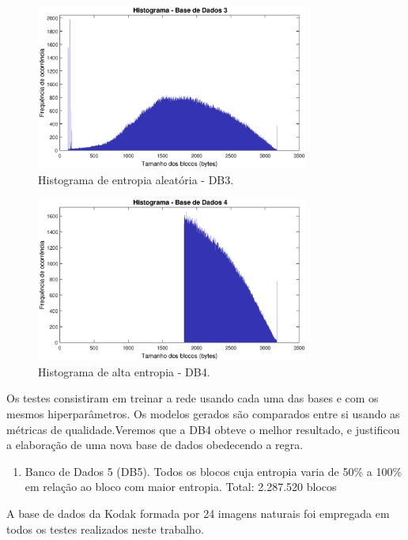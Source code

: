 \begin{figure}[h]
\centering
\includegraphics[width=0.80\textwidth]{figuras/hist3.eps}
\caption[Histograma da entropia aleatória - DB3]{Histograma de entropia aleatória - DB3.}
\label{fig:database3}
\end{figure}

\begin{figure}[h]
\centering
\includegraphics[width=0.8\textwidth]{figuras/hist4.eps}
\caption[Histograma de alta entropia - DB4]{Histograma de alta entropia - DB4.}
\label{fig:database4}
\end{figure}

Os testes consistiram em treinar a rede usando cada uma das bases e com os mesmos hiperparâmetros. Os modelos gerados são comparados entre si usando as métricas de qualidade.Veremos que a DB4 obteve o melhor resultado, e justificou a elaboração de uma nova base de dados obedecendo a regra.

\begin {enumerate}
\item Banco de Dados 5 (DB5). Todos os blocos cuja entropia varia de 50\% a 100\% em relação ao bloco com maior entropia. Total: 2.287.520 blocos
\end{enumerate}

A base de dados da Kodak \cite{kodak} formada por 24 imagens naturais foi empregada em todos os testes realizados neste trabalho.  

